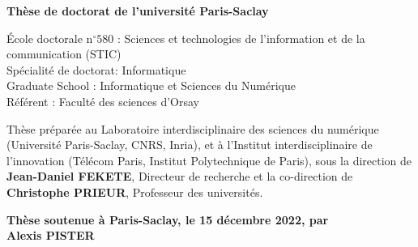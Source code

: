 \documentclass[12pt,a4paper, twoside, headings=small]{book}
\begin{document}
\begin{titlepage}
        \fontsize{8}{12}\selectfont

        \vspace{1.5cm}

        \normalsize
        \textbf{Thèse de doctorat de l'université Paris-Saclay} \\

        \vspace{6mm}

        \small École doctorale n$^{\circ}580$ : Sciences et technologies de l’information et de la communication (STIC)\\
        \small Spécialité de doctorat: Informatique\\
        \small Graduate School : Informatique et Sciences du Numérique\\
        \small Référent : Faculté des sciences d’Orsay \\
        \vspace{6mm}

        \footnotesize Thèse préparée au Laboratoire interdisciplinaire des sciences du numérique (Université Paris-Saclay, CNRS, Inria), et à l'Institut interdisciplinaire de l'innovation (Télécom Paris, Institut Polytechnique de Paris), sous la direction de \textbf{Jean-Daniel FEKETE}, Directeur de recherche et la co-direction de \textbf{Christophe PRIEUR}, Professeur des universités. \\

        \vspace{15mm}

        \textbf{Thèse soutenue à Paris-Saclay, le 15 décembre 2022, par}\\
        \bigskip
        \Large {\color{Prune} \textbf{Alexis PISTER}} %

        \vspace{\fill} %


\end{titlepage}
\end{document}
